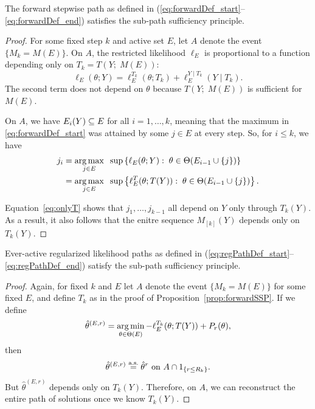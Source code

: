 \documentclass{article}
\begin{document}
\begin{proposition}\label{prop:forwardSSP}
  The forward stepwise path as defined in
  (\ref{eq:forwardDef_start}--\ref{eq:forwardDef_end}) satisfies the 
  sub-path sufficiency principle.
\end{proposition}
\begin{proof}
  For some fixed step $k$ and active set $E$, 
  let $A$ denote the event $\{M_k = M(E)\}$. 
  On $A$, the restricted likelihood $\ell_E$ is proportional to a
  function depending only on $T_k = T(Y; \;M(E))$:
  \[
  \ell_E(\theta; Y) = \ell_E^{T_k}(\theta; T_k) 
  + \ell_E^{Y \mid T_k}(Y \mid T_k).
  \]
  The second term does not depend on $\theta$ 
  because $T(Y; \;M(E))$ is sufficient for $M(E)$.

  On $A$, we have $E_i(Y) \subseteq E$ for all $i=1,\ldots, k$, meaning   that the maximum in \eqref{eq:forwardDef_start} was attained by some $j\in E$ at every step. So, for $i \leq k$, we have
\begin{align}
  j_i &= \operatorname*{arg\,max}_{j\in E} \;\;\sup \left\{\ell_E(\theta; Y):\;
    \theta\in\Theta(E_{i-1} \cup \{j\})\right\} \\
  &= \operatorname*{arg\,max}_{j\in E} \;\;\sup \left\{\ell_E^T(\theta; T(Y)):\;
    \theta\in\Theta(E_{i-1} \cup \{j\})\right\}. \label{eq:onlyT}
\end{align}

Equation~\eqref{eq:onlyT} shows that $j_1,\ldots, j_{k-1}$ all depend on $Y$ only through $T_k(Y)$. As a result, it also follows that the enitre sequence $M_{[k]}(Y)$ depends only on $T_k(Y)$.
\end{proof}

\begin{proposition}\label{prop:regPathSSP}
Ever-active regularized likelihood paths as defined in 
(\ref{eq:regPathDef_start}--\ref{eq:regPathDef_end}) satisfy the
sub-path sufficiency principle.
\end{proposition}

\begin{proof}
  Again, for fixed $k$ and $E$ let $A$ denote the event $\{M_k = M(E)\}$ for some fixed $E$, and define $T_k$ as in the proof of Proposition~\ref{prop:forwardSSP}. If we define
\[
\hat\theta^{(E,r)} = \operatorname*{arg\,min}_{\theta\in\Theta(E)} -\ell_E^{T_k}(\theta; T(Y)) + P_r(\theta),
\]
then 
\[
\hat\theta^{(E,r)} \overset{\textrm{a.s.}}{=} \hat\theta^{r} \text{ on } 
A \cap 1_{\{r \leq R_k\}}.
\]
But $\hat\theta^{(E,r)}$ depends only on $T_k(Y)$. Therefore, on $A$, we can reconstruct the entire path of solutions once we know $T_k(Y)$.
\end{proof}
\end{document}
